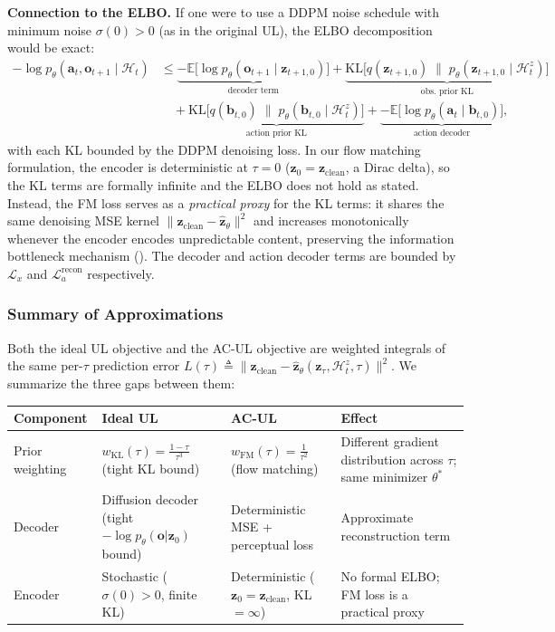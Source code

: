 \documentclass{article}
\newcommand{\vo}{\bm{o}}
\newcommand{\vz}{\bm{z}}
\newcommand{\va}{\bm{a}}
\newcommand{\vb}{\bm{b}}
\newcommand{\E}{\mathbb{E}}
\newcommand{\KL}{\mathrm{KL}}
\newcommand{\loss}{\mathcal{L}}
\begin{document}
\textbf{Connection to the ELBO.}
If one were to use a DDPM noise schedule with minimum noise $\sigma(0) > 0$ (as in the original UL), the ELBO decomposition would be exact:
\begin{align}
  -\log p_\theta(\va_t, \vo_{t+1} \mid \mathcal{H}_t)
  &\leq \underbrace{-\E\!\Big[\log p_\theta(\vo_{t+1} \mid \vz_{t+1,0})\Big]}_{\text{decoder term}} + \underbrace{\KL\!\Big[q(\vz_{t+1,0}) \;\Big\|\; p_\theta(\vz_{t+1,0} \mid \mathcal{H}_t^z)\Big]}_{\text{obs.\ prior KL}} \nonumber \\
  &\quad + \underbrace{\KL\!\Big[q(\vb_{t,0}) \;\Big\|\; p_\theta(\vb_{t,0} \mid \mathcal{H}_t^z)\Big]}_{\text{action prior KL}} + \underbrace{-\E\!\Big[\log p_\theta(\va_t \mid \vb_{t,0})\Big]}_{\text{action decoder}},
  \label{eq:proof_step}
\end{align}
with each KL bounded by the DDPM denoising loss. In our flow matching formulation, the encoder is deterministic at $\tau = 0$ ($\vz_0 = \vz_{\text{clean}}$, a Dirac delta), so the KL terms are formally infinite and the ELBO does not hold as stated.
Instead, the FM loss serves as a \emph{practical proxy} for the KL terms: it shares the same denoising MSE kernel $\|\vz_{\text{clean}} - \hat{\vz}_\theta\|^2$ and increases monotonically whenever the encoder encodes unpredictable content, preserving the information bottleneck mechanism ().
The decoder and action decoder terms are bounded by $\loss_x$ and $\loss_a^{\text{recon}}$ respectively.

\subsubsection{Summary of Approximations}

Both the ideal UL objective and the AC-UL objective are weighted integrals of the same per-$\tau$ prediction error $L(\tau) \triangleq \|\vz_{\text{clean}} - \hat{\vz}_\theta(\vz_\tau, \mathcal{H}_t^z, \tau)\|^2$.
We summarize the three gaps between them:

\begin{center}
\begin{tabular}{p{2.2cm}p{3.3cm}p{3.3cm}p{4.5cm}}
\toprule
\textbf{Component} & \textbf{Ideal UL} & \textbf{AC-UL} & \textbf{Effect} \\
\midrule
Prior weighting & $w_{\KL}(\tau) = \frac{1-\tau}{\tau^3}$ (tight KL bound) & $w_{\text{FM}}(\tau) = \frac{1}{\tau^2}$ (flow matching) & Different gradient distribution across $\tau$; same minimizer $\theta^*$ \\[4pt]
Decoder & Diffusion decoder (tight $-\log p_\theta(\vo|\vz_0)$ bound) & Deterministic MSE + perceptual loss & Approximate reconstruction term \\[4pt]
Encoder & Stochastic ($\sigma(0){>}0$, finite KL) & Deterministic ($\vz_0 {=} \vz_{\text{clean}}$, KL $= \infty$) & No formal ELBO; FM loss is a practical proxy \\
\bottomrule
\end{tabular}
\end{center}
\end{document}
